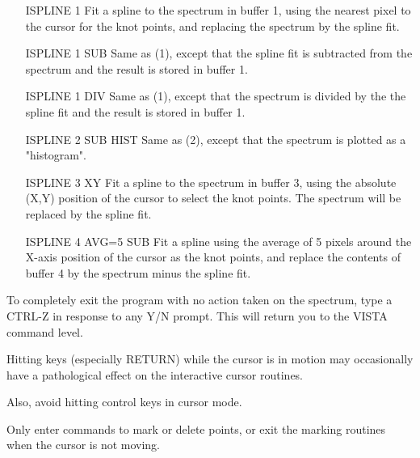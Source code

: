 \begin{itemize} 
  \item[ISPLINE 1 \hfill]{Fit a spline to the spectrum in buffer 1, using
       the nearest pixel to the cursor for the knot points, and replacing
       the spectrum by the spline fit.}

  \item[ISPLINE 1 SUB\hfill]{Same as (1), except that the spline fit is
       subtracted from the spectrum and the result is stored in buffer 1.}

  \item[ISPLINE 1 DIV \hfill]{Same as (1), except that the spectrum is
       divided by the the spline fit and the result is stored in buffer 1.}

  \item[ISPLINE 2 SUB HIST\hfill]{Same as (2), except that the spectrum is
       plotted as a "histogram".}

  \item[ISPLINE 3 XY\hfill]{Fit a spline to the spectrum in buffer 3, using
       the absolute (X,Y) position of the cursor to select the knot points.
       The spectrum will be replaced by the spline fit.}

  \item[ISPLINE 4 AVG=5 SUB\hfill]{Fit a spline using the average of 5
       pixels around the X-axis position of the cursor as the knot points,
       and replace the contents of buffer 4 by the spectrum minus the
       spline fit.}
\end{itemize} 


To completely exit the program with no action taken on the spectrum, type a
CTRL-Z in response to any Y/N prompt.  This will return you to the VISTA
command level.
 
 
Hitting keys (especially RETURN) while the cursor is in motion may
occasionally have a pathological effect on the interactive cursor routines.
 
Also, avoid hitting control keys in cursor mode.
 
Only enter commands to mark or delete points, or exit the marking routines
when the cursor is not moving.

